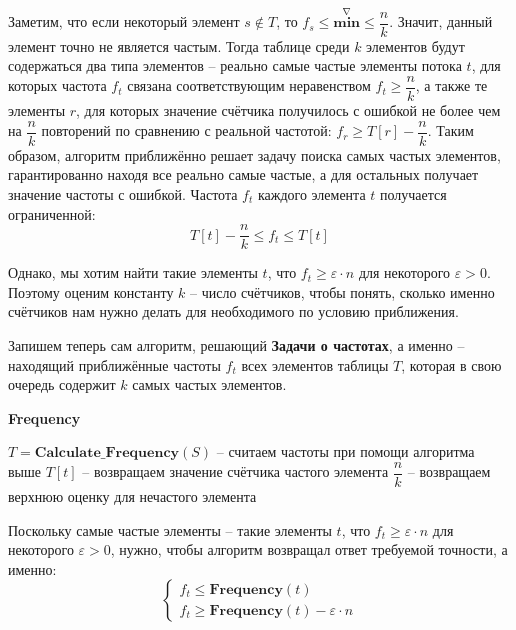 \documentclass[a4paper,12pt]{article}
\begin{document}
Заметим, что если некоторый элемент $s \notin T$, то $f_s \leqslant \overset{\nabla}{\textbf{min}} \leqslant \dfrac{n}{k}$. Значит, данный элемент точно не является частым. Тогда таблице среди $k$ элементов будут содержаться два типа элементов -- реально самые частые элементы потока $t$, для которых частота $f_t$ связана соответствующим неравенством $f_t \geqslant \dfrac{n}{k}$, а также те элементы $r$, для которых значение счётчика получилось с ошибкой не более чем на $\dfrac{n}{k}$ повторений по сравнению с реальной частотой: $f_r \geqslant T[r] - \dfrac{n}{k}$. Таким образом, алгоритм приближённо решает задачу поиска самых частых элементов, гарантированно находя все реально самые частые, а для остальных получает значение частоты с ошибкой. Частота $f_t$ каждого элемента $t$ получается ограниченной:
\[T[t] - \dfrac{n}{k} \leqslant f_t \leqslant T[t]\]

Однако, мы хотим найти такие элементы $t$, что $f_t \geqslant \varepsilon \cdot n$ для некоторого $\varepsilon > 0$. Поэтому оценим константу $k$ -- число счётчиков, чтобы понять, сколько именно счётчиков нам нужно делать для необходимого по условию приближения.

Запишем теперь сам алгоритм, решающий \textbf{Задачи о частотах}, а именно -- находящий приближённые частоты $f_t$ всех элементов таблицы $T$, которая в свою очередь содержит $k$ самых частых элементов.

\begin{algorithm}[H]
    \caption{\textbf{Frequency}}
    \begin{algorithmic}[1]
        \Statex
        \State $T = \textbf{Calculate\_Frequency}(S)$ -- считаем частоты при помощи алгоритма выше
            \State\Return $T[t]$ -- возвращаем значение счётчика частого элемента
        \Else
            \State\Return $\dfrac{n}{k}$ -- возвращаем верхнюю оценку для нечастого элемента
        \EndIf
    \end{algorithmic}
\end{algorithm}

Поскольку самые частые элементы -- такие элементы $t$, что $f_t \geqslant \varepsilon \cdot n$ для некоторого $\varepsilon > 0$, нужно, чтобы алгоритм возвращал ответ требуемой точности, а именно:
\[\begin{cases}f_t \leqslant \textbf{Frequency}(t)\\f_t \geqslant \textbf{Frequency}(t) - \varepsilon\cdot n\end{cases}\]
\end{document}
